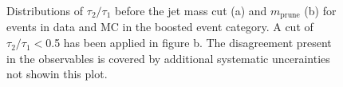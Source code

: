 \begin{figure}[hbtp]\begin{center}
 \caption{Distributions of $\tau_2/\tau_1$ before the jet mass cut (a)
   and $m_{\mathrm{prune}}$ (b) for events in data and MC in the boosted event category. 
 A cut of $\tau_2/\tau_1<$0.5 has been applied in figure b. The
 disagreement present in the observables is covered by additional
 systematic uncerainties not showin this plot.}
 \label{fig:boostvtagvars}\end{center}\end{figure}

